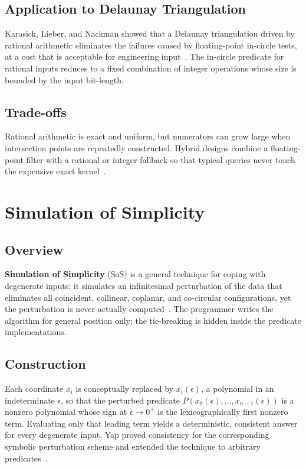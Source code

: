 \subsection{Application to Delaunay Triangulation}
Karasick, Lieber, and Nackman showed that a Delaunay triangulation driven by
rational arithmetic eliminates the failures caused by floating-point in-circle
tests, at a cost that is acceptable for engineering input~\cite{karasick1991}.
The in-circle predicate for rational inputs reduces to a fixed combination of
integer operations whose size is bounded by the input bit-length.

\subsection{Trade-offs}
Rational arithmetic is exact and uniform, but numerators can grow large when
intersection points are repeatedly constructed. Hybrid designs combine a
floating-point filter with a rational or integer fallback so that typical
queries never touch the expensive exact kernel~\cite{fortune1993,karasick1991}.

\section{Simulation of Simplicity}
\label{sec:simulation_of_simplicity}

\subsection{Overview}
\textbf{Simulation of Simplicity} (SoS) is a
general technique for coping with degenerate inputs: it simulates an
infinitesimal perturbation of the data that eliminates all coincident,
collinear, coplanar, and co-circular configurations, yet the perturbation is
never actually computed~\cite{edelsbrunner1990}. The programmer writes the
algorithm for general position only; the tie-breaking is hidden inside the
predicate implementations.

\subsection{Construction}
Each coordinate $x_i$ is conceptually replaced by $x_i(\epsilon)$, a
polynomial in an indeterminate $\epsilon$, so that the perturbed predicate
$P(x_0(\epsilon), \ldots, x_{n-1}(\epsilon))$ is a nonzero polynomial whose
sign at $\epsilon \to 0^{+}$ is the lexicographically first nonzero term.
Evaluating only that leading term yields a deterministic, consistent answer
for every degenerate input. Yap proved consistency for the corresponding
symbolic perturbation scheme and extended the technique to arbitrary
predicates~\cite{yap1988,yap1990}.

